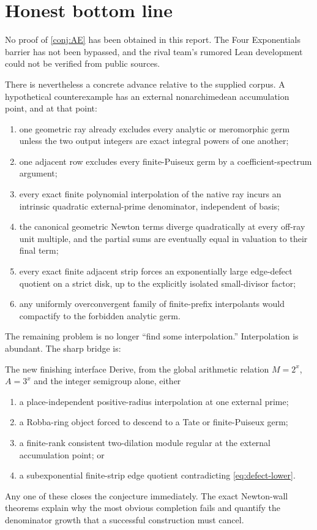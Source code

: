 \documentclass[11pt,oneside]{article}
\theoremstyle{definition}
\begin{document}
\section{Honest bottom line}
\label{sec:bottom-line}

No proof of \cref{conj:AE} has been obtained in this report.  The Four Exponentials barrier
has not been bypassed, and the rival team's rumored Lean development could not be verified
from public sources.

There is nevertheless a concrete advance relative to the supplied corpus.  A hypothetical
counterexample has an external nonarchimedean accumulation point, and at that point:

\begin{enumerate}
\item one geometric ray already excludes every analytic or meromorphic germ unless the two
  output integers are exact integral powers of one another;
\item one adjacent row excludes every finite-Puiseux germ by a coefficient-spectrum argument;
\item every exact finite polynomial interpolation of the native ray incurs an intrinsic
  quadratic external-prime denominator, independent of basis;
\item the canonical geometric Newton terms diverge quadratically at every off-ray unit
  multiple, and the partial sums are eventually equal in valuation to their final term;
\item every exact finite adjacent strip forces an exponentially large edge-defect quotient on
  a strict disk, up to the explicitly isolated small-divisor factor;
\item any uniformly overconvergent family of finite-prefix interpolants would compactify to the
  forbidden analytic germ.
\end{enumerate}

The remaining problem is no longer ``find some interpolation.''  Interpolation is abundant.
The sharp bridge is:

\begin{resultbox}{The new finishing interface}
Derive, from the global arithmetic relation $M=2^x$, $A=3^x$ and the integer semigroup alone,
either
\begin{enumerate}[label=(\roman*)]
\item a place-independent positive-radius interpolation at one external prime;
\item a Robba-ring object forced to descend to a Tate or finite-Puiseux germ;
\item a finite-rank consistent two-dilation module regular at the external accumulation point;
  or
\item a subexponential finite-strip edge quotient contradicting
  \eqref{eq:defect-lower}.
\end{enumerate}
Any one of these closes the conjecture immediately.  The exact Newton-wall theorems explain
why the most obvious completion fails and quantify the denominator growth that a successful
construction must cancel.
\end{resultbox}
\end{document}
